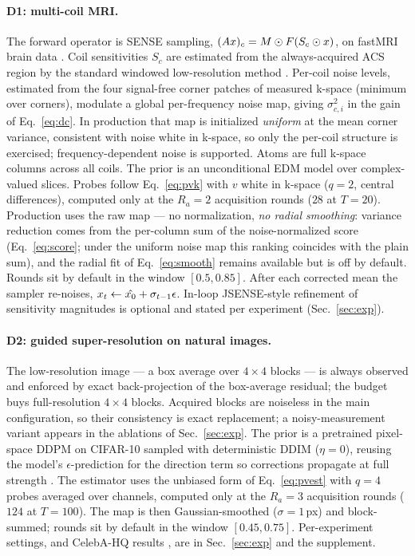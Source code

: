 \paragraph{D1: multi-coil MRI.}
The forward operator is SENSE sampling,
$(A x)_c = M \odot F(S_c \odot x)$, on fastMRI brain data
\cite{zbontar2018fastmri}. Coil sensitivities $S_c$ are estimated from
the always-acquired ACS region by the standard windowed low-resolution
method \cite{uecker2014espirit}. Per-coil noise levels, estimated from
the four signal-free corner patches of measured k-space (minimum over
corners), modulate a global per-frequency noise map, giving
$\sigma_{c,i}^2$ in the gain of Eq.~\ref{eq:dc}. In production that map
is initialized \emph{uniform} at the mean corner variance, consistent
with noise white in k-space, so only the per-coil structure is
exercised; frequency-dependent noise is supported. Atoms are full
k-space columns across all coils. The prior is an unconditional EDM
model \cite{karras2022edm} over complex-valued slices. Probes follow
Eq.~\ref{eq:pvk} with $v$ white in k-space ($q{=}2$, central
differences), computed only at the $R_a{=}2$ acquisition rounds
($28$ \nfe{} at $T{=}20$). Production uses the raw map --- no
normalization, \emph{no radial smoothing}: variance reduction comes from
the per-column sum of the noise-normalized score (Eq.~\ref{eq:score};
under the uniform noise map this ranking coincides with the plain sum),
and the radial fit of Eq.~\ref{eq:smooth} remains available but is off
by default. Rounds sit by default in the window $[0.5, 0.85]$. After
each corrected mean the sampler re-noises,
$x_t \leftarrow \hat{x_0} + \sigma_{t-1}\epsilon$. In-loop JSENSE-style
refinement of sensitivity magnitudes is optional and stated per
experiment (Sec.~\ref{sec:exp}).

\paragraph{D2: guided super-resolution on natural images.}
The low-resolution image --- a box average over $4{\times}4$ blocks ---
is always observed and enforced by exact back-projection of the
box-average residual; the budget buys full-resolution $4{\times}4$
blocks. Acquired blocks are noiseless in the main configuration, so
their consistency is exact replacement; a noisy-measurement variant
appears in the ablations of Sec.~\ref{sec:exp}. The prior is a
pretrained pixel-space DDPM \cite{ho2020ddpm} on CIFAR-10
\cite{krizhevsky2009cifar} sampled with deterministic DDIM
\cite{song2021ddim} ($\eta{=}0$), reusing the model's
$\epsilon$-prediction for the direction term so corrections propagate at
full strength \cite{wang2023ddnm}. The estimator uses the unbiased form
of Eq.~\ref{eq:pvest} with $q{=}4$ probes averaged over channels,
computed only at the $R_a{=}3$ acquisition rounds ($124$ \nfe{} at
$T{=}100$). The map is then Gaussian-smoothed ($\sigma{=}1$\,px) and
block-summed; rounds sit by default in the window $[0.45, 0.75]$.
Per-experiment settings, and CelebA-HQ results
\cite{karras2018progressive}, are in Sec.~\ref{sec:exp} and the
supplement.

